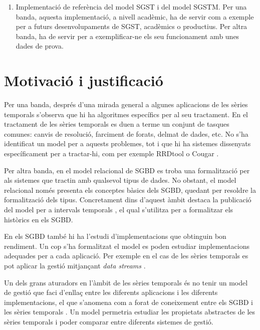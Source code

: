 \begin{enumerate}
\item Implementació de referència del model SGST i del model
  SGSTM. Per una banda, aquesta implementació, a nivell acadèmic, ha
  de servir com a exemple per a futurs desenvolupaments de SGST,
  acadèmics o productius. Per altra banda, ha de servir per a
  exemplificar-ne els seu funcionament amb unes dades de prova.



\end{enumerate}






\section{Motivació i justificació}


Per una banda, després d'una mirada general a algunes aplicacions de
les sèries temporals s'observa que hi ha algoritmes específics per al
seu tractament. En el tractament de les sèries temporals es duen a
terme un conjunt de tasques comunes: canvis de resolució, farciment de
forats, delmat de dades, etc. No s'ha identificat un model per a
aquests problemes, tot i que hi ha sistemes dissenyats específicament
per a tractar-hi, com per exemple RRDtool \parencite{rrdtool} o
Cougar \parencite{fung02}.

Per altra banda, en el model relacional de SGBD es troba una
formalització per als sistemes que tractin amb qualsevol tipus de
dades. No obstant, el model relacional només presenta els conceptes
bàsics dels SGBD, quedant per resoldre la formalització dels
tipus. Concretament dins d'aquest àmbit destaca la publicació del
model per a intervals
temporals \parencite{date02:_tempor_data_relat_model}, el qual
s'utilitza per a formalitzar els històrics en els SGBD.

En els SGBD també hi ha l'estudi d'implementacions que obtinguin bon rendiment. Un cop s'ha formalitzat el model es poden estudiar implementacions adequades per a cada aplicació. Per exemple en el cas de les sèries temporals es pot aplicar la gestió mitjançant \emph{data streams} \parencite{babcock02}.




Un dels grans aturadors en l'àmbit de les sèries temporals és no tenir un model de gestió que faci d'enllaç entre les diferents aplicacions i les diferents implementacions, el que s'anomena com a forat de coneixement entre els SGBD i les sèries temporals \parencite{zhang11,stonebraker09:scidb}. Un model permetria estudiar les propietats abstractes de les sèries temporals i poder comparar entre diferents sistemes de gestió.













